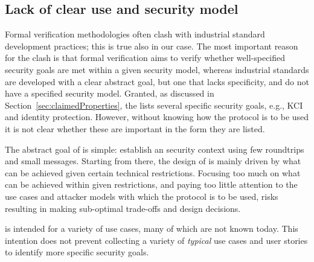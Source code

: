 \documentclass[runningheads, envcountsame, a4paper, draft, x11names]{llncs}
\newcommand{\fillhack}{\vspace{-0.5em}}
\begin{document}
\subsection{Lack of clear use and security model}
\label{sec:unclearProtocolUse}
\fillhack
{}
Formal verification methodologies often clash with industrial standard
development practices; this is true also in our case.
%
The most important reason for the clash is that formal verification aims to
verify whether well-specified security goals are met within a given security
model, whereas industrial standards are developed with a clear abstract goal,
but one that lacks specificity, and do not have a specified security model.
%
Granted, as discussed in Section~\ref{sec:claimedProperties}, the \mSpec{} lists
several specific security goals, e.g., KCI and identity protection.
However, without knowing how the protocol is to be used
it is not clear whether these are important in the form they are listed.
%

The abstract goal of \mEdhoc{} is simple: establish an \mOscore{} security
context using few roundtrips and small messages.
%
Starting from there, the design of \mEdhoc{} is mainly driven by what
can be achieved given certain technical restrictions.
%
Focusing too much on what can be achieved within given restrictions, and paying
too little attention to the use cases and attacker models with which the
protocol is to be used, risks resulting in making sub-optimal trade-offs and
design decisions.
%

\mEdhoc{} is intended for a variety of use cases, many of which are not
known today.
%
This intention does not prevent collecting a variety of \emph{typical}
use cases and user stories to identify more specific security goals.
%
\end{document}
